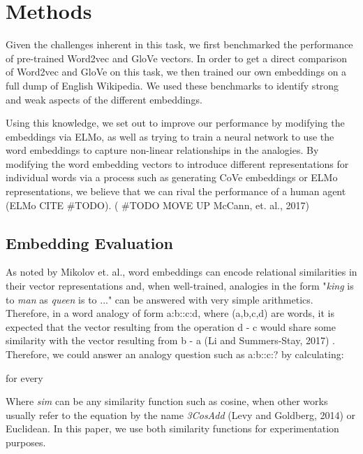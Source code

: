 \documentclass[11pt]{article}
\begin{document}
\section{Methods}

Given the challenges inherent in this task, we first benchmarked the
performance of pre-trained Word2vec and GloVe vectors. In order to get a
direct comparison of Word2vec and GloVe on this task, we then trained
our own embeddings on a full dump of English Wikipedia. We used these
benchmarks to identify strong and weak aspects of the different
embeddings.

Using this knowledge, we set out to improve our performance by modifying
the embeddings via ELMo, as well as trying to train a neural network to
use the word embeddings to capture non-linear relationships in the
analogies. By modifying the word embedding vectors to introduce
different representations for individual words via a process such as
generating CoVe embeddings or ELMo representations, we believe that we
can rival the performance of a human agent (ELMo CITE \#TODO). ( \#TODO
MOVE UP McCann, et. al., 2017)

\subsection{Embedding Evaluation}

As noted by Mikolov et. al., word embeddings can encode relational
similarities in their vector representations and, when well-trained,
analogies in the form "\emph{king }is to \emph{man }as \emph{queen} is
to ..." can be answered with very simple arithmetics. Therefore, in a
word analogy of form a:b::c:d, where (a,b,c,d) are words, it is expected
that the vector resulting from the operation d - c would share some
similarity with the vector resulting from b - a (Li and Summers-Stay,
2017) . Therefore, we could answer an analogy question such as a:b::c:?
by calculating:

for every

Where \emph{sim }can be any similarity function such as cosine, when
other works usually refer to the equation by the name \emph{3CosAdd}
(Levy and Goldberg, 2014) or Euclidean. In this paper, we use both
similarity functions for experimentation purposes.
\end{document}

